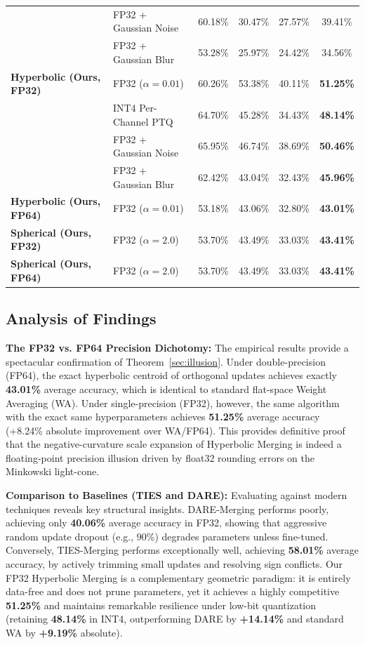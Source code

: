 \documentclass{article}
\theoremstyle{plain}
\theoremstyle{definition}
\theoremstyle{remark}
\begin{document}
\begin{table}[t]
\begin{center}
\begin{small}
\begin{tabular}{llcccc}
& FP32 + Gaussian Noise & 60.18\% & 30.47\% & 27.57\% & 39.41\% \\
& FP32 + Gaussian Blur & 53.28\% & 25.97\% & 24.42\% & 34.56\% \\
\midrule
\textbf{Hyperbolic (Ours, FP32)} & FP32 ($\alpha = 0.01$) & 60.26\% & 53.38\% & 40.11\% & \textbf{51.25\%} \\
& INT4 Per-Channel PTQ & 64.70\% & 45.28\% & 34.43\% & \textbf{48.14\%} \\
& FP32 + Gaussian Noise & 65.95\% & 46.74\% & 38.69\% & \textbf{50.46\%} \\
& FP32 + Gaussian Blur & 62.42\% & 43.04\% & 32.43\% & \textbf{45.96\%} \\
\midrule
\textbf{Hyperbolic (Ours, FP64)} & FP32 ($\alpha = 0.01$) & 53.18\% & 43.06\% & 32.80\% & \textbf{43.01\%} \\
\midrule
\textbf{Spherical (Ours, FP32)} & FP32 ($\alpha = 2.0$) & 53.70\% & 43.49\% & 33.03\% & \textbf{43.41\%} \\
\midrule
\textbf{Spherical (Ours, FP64)} & FP32 ($\alpha = 2.0$) & 53.70\% & 43.49\% & 33.03\% & \textbf{43.41\%} \\
\bottomrule
\end{tabular}
\end{small}
\end{center}
\vskip -0.1in
\end{table}

\subsection{Analysis of Findings}
\textbf{The FP32 vs. FP64 Precision Dichotomy:} The empirical results provide a spectacular confirmation of Theorem~\ref{sec:illusion}. Under double-precision (FP64), the exact hyperbolic centroid of orthogonal updates achieves exactly \textbf{43.01\%} average accuracy, which is identical to standard flat-space Weight Averaging (WA). Under single-precision (FP32), however, the same algorithm with the exact same hyperparameters achieves \textbf{51.25\%} average accuracy (+8.24\% absolute improvement over WA/FP64). This provides definitive proof that the negative-curvature scale expansion of Hyperbolic Merging is indeed a floating-point precision illusion driven by float32 rounding errors on the Minkowski light-cone.

\textbf{Comparison to Baselines (TIES and DARE):} Evaluating against modern techniques reveals key structural insights. DARE-Merging performs poorly, achieving only \textbf{40.06\%} average accuracy in FP32, showing that aggressive random update dropout (e.g., $90\%$) degrades parameters unless fine-tuned. Conversely, TIES-Merging performs exceptionally well, achieving \textbf{58.01\%} average accuracy, by actively trimming small updates and resolving sign conflicts. Our FP32 Hyperbolic Merging is a complementary geometric paradigm: it is entirely data-free and does not prune parameters, yet it achieves a highly competitive \textbf{51.25\%} and maintains remarkable resilience under low-bit quantization (retaining \textbf{48.14\%} in INT4, outperforming DARE by \textbf{+14.14\%} and standard WA by \textbf{+9.19\%} absolute).
\end{document}
